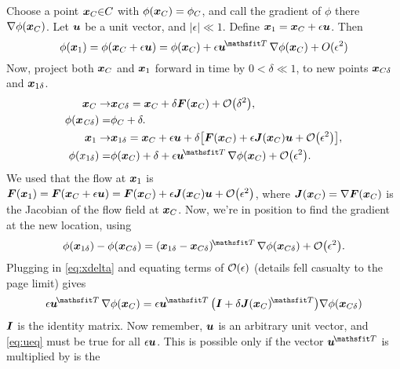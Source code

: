 \documentclass[10pt,letter, swedish, english,%
]{article}
\newcommand{\T}{{\!\mathsfrm{T}}}
\newcommand{\I}{{\mathbfrm{I}}}
\begin{document}
Choose a point  ${\vb{x}}_{C}{\in}C$ with
$\phi({\vb{x}}_{C})={\phi}_{C}$, and call the gradient of  $\phi$
there  ${\nabla}\phi({\vb{x}}_{C})$. Let  $\vb{u}$ be a unit vector, and
$|\epsilon|{\ll}1$. Define
${\vb{x}}_{1}={\vb{x}}_{C}+\epsilon\vb{u}$. Then  
\begin{equation}
\phi ({\vb{x}}_{1})=\phi({\vb{x}}_{C}+\epsilon\vb{u})
=\phi({\vb{x}}_{C}) + \epsilon{\vb{u}}^{\T}\,{\nabla}\phi
({\vb{x}}_{C})+O({\epsilon }^{2})
\end{equation}
Now, project both  $\vb{x}_{C}$ and  $\vb{x}_{1}$ forward in time by 
$0<\delta\ll1$, to new points  $\vb{x}_{C\delta}$ and 
$\vb{x}_{1\delta}$. 
\begin{equation}\label{eq:xdelta}
\begin{aligned}
{\vb{x}}_{C}\to& \vb{x}_{C\delta}
=\vb{x}_{C}+\delta\vb{F}({\vb{x}}_{C})+\order{\delta^2},\\
\phi({\vb{x}}_{\mathit{C\delta }})=&{\phi}_{C}+\delta. \\
\vb{x}_1\to& \vb{x}_{1\delta}
 =\vb{x}_{C}+\epsilon \vb{u}+
  \delta\qty[\vb{F}(\vb{x}_{C})+\epsilon \vb{J}(\vb{x}_{C})\vb{u}
  +\order{\epsilon^2}],\\
\phi({x}_{1\delta })=&\phi(\vb{x}_{C}) + \delta 
 +\epsilon {\vb{u}}^{\T}\,{\nabla}\phi(\vb{x}_{C})
 +\order{\epsilon^2}.
\end{aligned}
\end{equation}
We used that the flow at  $\vb{x}_{1}$ is 
$\vb{F}(\vb{x}_{1})
=\vb{F}(\vb{x}_{C}+\epsilon\vb{u})
=\vb{F}(\vb{x}_{C})+\epsilon\vb{J}(\vb{x}_{C})\vb{u}+\order{\epsilon^2}$, where 
$\vb{J}(\vb{x}_{C})={\nabla}\vb{F}(\vb{x}_{C})$ is the Jacobian of the
flow field at  $\vb{x}_{C}$. Now, we're in position to find the gradient
at the new location, using
\begin{equation}
\phi(\vb{x}_{1\delta })-\phi(\vb{x}_{C\delta})
=(\vb{x}_{1\delta }-\vb{x}_{C\delta})^{\T}\,
{\nabla}\phi(\vb{x}_{C\delta})+\order{\epsilon^2}.
\end{equation}
Plugging in \eqref{eq:xdelta} and equating terms of  $\order{\epsilon}$ 
(details fell casualty to the page limit) gives
\begin{equation}\label{eq:ueq}
\epsilon {\vb{u}}^{\T}\,{\nabla}\phi(\vb{x}_{C})=\epsilon
{\vb{u}}^{\T}\,\qty(\I+\delta\vb{J}(\vb{x}_{C})^{\T})
{\nabla}\phi(\vb{x}_{C\delta})
\end{equation}
$\I$ is the identity matrix. Now remember, $\vb{u}$ is an
arbitrary unit vector, and \eqref{eq:ueq} must be true for all  $\epsilon\vb{u}$. This
is possible only if the vector  ${\vb{u}}^{\T}$ is multiplied by is the
\end{document}
